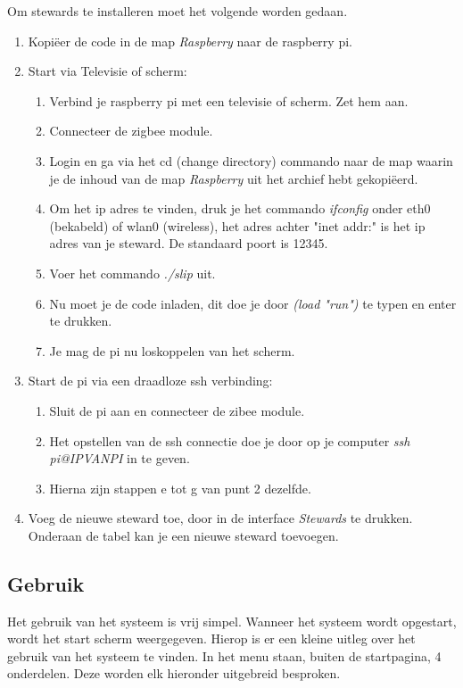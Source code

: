 \documentclass{article}
\begin{document}
Om stewards te installeren moet het volgende worden gedaan.
\begin{enumerate}
	\item Kopi\"eer de code in de map \emph{Raspberry} naar de raspberry pi.
	\item Start via Televisie of scherm: 
	\begin{enumerate}
		\item Verbind je raspberry pi met een televisie of scherm. Zet hem aan.
		\item Connecteer de zigbee module.
		\item Login en ga via het cd (change directory) commando naar de map waarin je de inhoud van de map \emph{Raspberry} uit het archief hebt gekopi\"eerd.
		\item Om het ip adres te vinden, druk je het commando \emph{ifconfig} onder eth0 (bekabeld) of wlan0 (wireless), het adres achter "inet addr:" is het ip adres van je steward. De standaard poort is 12345.
		\item Voer het commando \emph{./slip} uit.
		\item Nu moet je de code inladen, dit doe je door \emph{(load "run")} te typen en enter te drukken. 
		\item Je mag de pi nu loskoppelen van het scherm.
	\end{enumerate}
	\item Start de pi via een draadloze ssh verbinding:
	\begin{enumerate}
		\item Sluit de pi aan en connecteer de zibee module.
		\item Het opstellen van de ssh connectie doe je door op je computer \emph{ssh pi@IPVANPI} in te geven.
		\item Hierna zijn stappen e tot g van punt 2 dezelfde.
	\end{enumerate}
	\item Voeg de nieuwe steward toe, door in de interface \emph{Stewards} te drukken. Onderaan de tabel kan je een nieuwe steward toevoegen.
\end{enumerate}

\subsection{Gebruik}
\label{sub:usage}
Het gebruik van het systeem is vrij simpel. Wanneer het systeem wordt opgestart, wordt het start scherm weergegeven. Hierop is er een kleine uitleg over het gebruik van het systeem te vinden. In het menu staan, buiten de startpagina,  4 onderdelen. Deze worden elk hieronder uitgebreid besproken. \\
\end{document}
